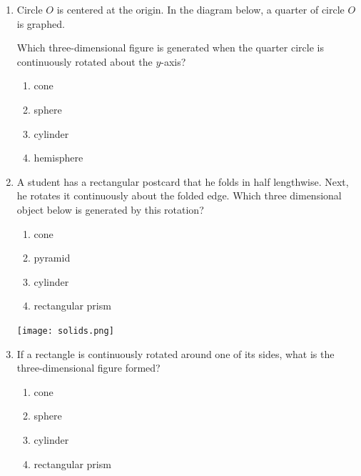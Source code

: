 \documentclass[12pt, twoside]{article}
\begin{document}
\begin{enumerate}
  \item %
  Circle $O$ is centered at the origin. In the diagram below, a quarter of circle $O$ is graphed.
    \begin{center}
      \end{center}
    Which three-dimensional figure is generated when the quarter circle is continuously rotated about the $y$-axis?
    \begin{multicols}{2}
      \begin{enumerate}
      \item cone
      \item sphere
      \item cylinder
      \item hemisphere
      \end{enumerate}
    \end{multicols}

  \item A student has a rectangular postcard that he folds in half lengthwise. Next, he rotates it continuously about the folded edge. Which three dimensional object below is generated by this rotation?
    \begin{multicols}{2}
    \begin{enumerate}
      \item cone
      \item pyramid
      \item cylinder
      \item rectangular prism
    \end{enumerate}
    \texttt{[image: solids.png]}
    \end{multicols}

\newpage
  \item %
   If a rectangle is continuously rotated around one of its sides, what is the three-dimensional figure formed?
   \begin{multicols}{2}
    \begin{enumerate}
      \item cone
      \item sphere
      \item cylinder
      \item rectangular prism
    \end{enumerate}
  \end{multicols}


\end{enumerate}
\end{document}
